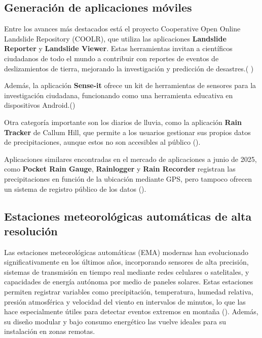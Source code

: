 \subsection{Generación de aplicaciones móviles}

Entre los avances más destacados está el proyecto Cooperative Open Online Landslide Repository (COOLR), que utiliza las aplicaciones \textbf{Landslide Reporter} y \textbf{Landslide Viewer}. Estas herramientas invitan a científicos ciudadanos de todo el mundo a contribuir con reportes de eventos de deslizamientos de tierra, mejorando la investigación y predicción de desastres.(\cite{coolr2021} )

Además, la aplicación \textbf{Sense-it} ofrece un kit de herramientas de sensores para la investigación ciudadana, funcionando como una herramienta educativa en dispositivos Android.(\cite{van2017senseit})


Otra categoría importante son los diarios de lluvia, como la aplicación \textbf{Rain Tracker} de Callum Hill, que permite a los usuarios gestionar sus propios datos de precipitaciones, aunque estos no son accesibles al público  (\cite{hill2021raintracker}).

Aplicaciones similares encontradas en el mercado de aplicaciones a junio de 2025, como \textbf{Pocket Rain Gauge}, \textbf{Rainlogger} y \textbf{Rain Recorder} registran las precipitaciones en función de la ubicación mediante GPS, pero tampoco ofrecen un sistema de registro público de los datos (\cite{PocketRainGauge2025, RainLogV2}).



\subsection{Estaciones meteorológicas automáticas de alta resolución}

Las estaciones meteorológicas automáticas (EMA) modernas han evolucionado significativamente en los últimos años, incorporando sensores de alta precisión, sistemas de transmisión en tiempo real mediante redes celulares o satelitales, y capacidades de energía autónoma por medio de paneles solares. Estas estaciones permiten registrar variables como precipitación, temperatura, humedad relativa, presión atmosférica y velocidad del viento en intervalos de minutos, lo que las hace especialmente útiles para detectar eventos extremos en montaña (\cite{sabziparvar2019estimation}). Además, su diseño modular y bajo consumo energético las vuelve ideales para su instalación en zonas remotas.

